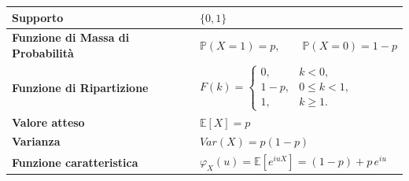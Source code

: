 \bigskip
\begin{table}[H]
\centering
\renewcommand{\arraystretch}{2}
\begin{tabular}{@{}ll@{}}
\toprule
\textbf{Supporto} 
& $\{0,1\}$ \\

\midrule

\textbf{Funzione di Massa di Probabilità} 
& $\mathbb{P}(X=1)=p,\qquad \mathbb{P}(X=0)=1-p$ \\

\midrule

\textbf{Funzione di Ripartizione}
& $F(k)=
\begin{cases}
0, & k<0,\\[4pt]
1-p, & 0\le k<1,\\[4pt]
1, & k\ge 1.
\end{cases}$ \\[6pt]

\midrule

\textbf{Valore atteso} 
& $\mathbb{E}[X]=p$ \\

\midrule

\textbf{Varianza}
& $Var(X)=p(1-p)$ \\

\midrule

\textbf{Funzione caratteristica}
& $\varphi_X(u)=\mathbb{E}[e^{iuX}]=(1-p)+p\,e^{iu}$ \\

\bottomrule
\end{tabular}
\end{table}
